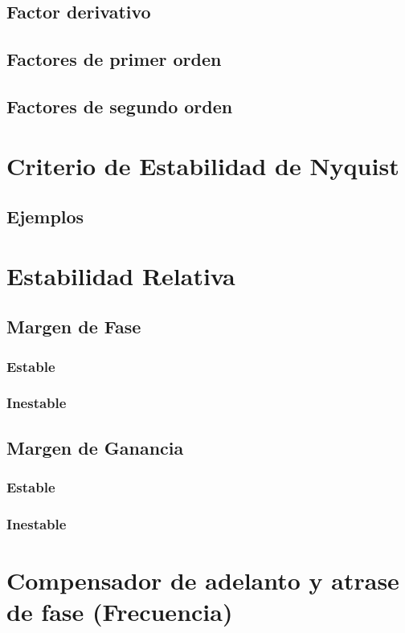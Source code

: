 \documentclass[12pt]{article}
\numberwithin{equation}{subsection}
\begin{document}
\subsection{Factor derivativo}
\subsection{Factores de primer orden}
\subsection{Factores de segundo orden}

\newpage
\section{Criterio de Estabilidad de Nyquist}
\subsection{Ejemplos}

\newpage
\section{Estabilidad Relativa}
\subsection{Margen de Fase}
\subsubsection{Estable}
\subsubsection{Inestable}
\subsection{Margen de Ganancia}
\subsubsection{Estable}
\subsubsection{Inestable}

\newpage
\section{Compensador de adelanto y atrase de fase (Frecuencia)}
\end{document}
